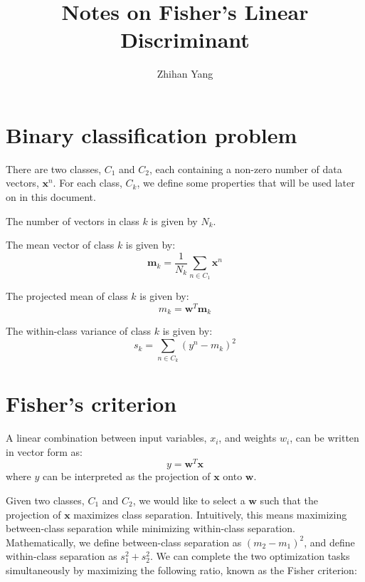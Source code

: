 \documentclass[12pt]{article}
\begin{document}
	
	\title{Notes on Fisher's Linear Discriminant}
	\author{Zhihan Yang}
	\maketitle
	
	\section{Binary classification problem}
	
	There are two classes, $C_1$ and $C_2$, each containing a non-zero number of data vectors, $\boldsymbol{x}^n$. For each class, $C_k$, we define some properties that will be used later on in this document.
	
	The number of vectors in class $k$ is given by $N_k$.
	
	The mean vector of class $k$ is given by:
	$$\boldsymbol{m}_k=\frac{1}{N_k} \sum_{n \in C_1}\boldsymbol{x}^n$$
	
	The projected mean of class $k$ is given by:
	$$m_k = \boldsymbol{w}^T \boldsymbol{m}_k$$
	
	The within-class variance of class $k$ is given by:
	$$s_k = \sum_{n \in C_k}(y^n - m_k)^2$$
	
	
	\section{Fisher's criterion}
	
	A linear combination between input variables, $x_i$, and weights $w_i$, can be written in vector form as: 
	$$y=\boldsymbol{w}^T \boldsymbol{x}$$
	where $y$ can be interpreted as the projection of $\boldsymbol{x}$ onto $\boldsymbol{w}$.
	
	Given two classes, $C_1$ and $C_2$, we would like to select a $\boldsymbol{w}$ such that the projection of $\boldsymbol{x}$ maximizes class separation. Intuitively, this means maximizing between-class separation while minimizing within-class separation. Mathematically, we define between-class separation as $(m_2 - m_1)^2$, and define within-class separation as $s_1^2+s_2^2$. We can complete the two optimization tasks simultaneously by maximizing the following ratio, known as the Fisher criterion:
	
\end{document}
